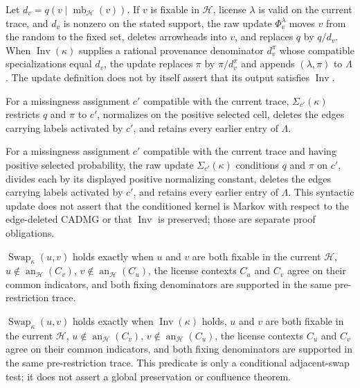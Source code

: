 Let \(d_v=q(v\mid\operatorname{mb}_{\mathcal H}(v))\). If \(v\) is fixable in \(\mathcal H\), license \(\lambda\) is valid on the current trace, and \(d_v\) is nonzero on the stated support, the raw update \(\Phi_v^{\lambda}\) moves \(v\) from the random to the fixed set, deletes arrowheads into \(v\), and replaces \(q\) by \(q/d_v\). When \(\operatorname{Inv}(\kappa)\) supplies a rational provenance denominator \(d_v^{\pi}\) whose compatible specializations equal \(d_v\), the update replaces \(\pi\) by \(\pi/d_v^{\pi}\) and appends \((\lambda,\pi)\) to \(\Lambda\). The update definition does not by itself assert that its output satisfies \(\operatorname{Inv}\).

For a missingness assignment \(c'\) compatible with the current trace, \(\Sigma_{c'}(\kappa)\) restricts \(q\) and \(\pi\) to \(c'\), normalizes on the positive selected cell, deletes the edges carrying labels activated by \(c'\), and retains every earlier entry of \(\Lambda\).

For a missingness assignment \(c'\) compatible with the current trace and having positive selected probability, the raw update \(\Sigma_{c'}(\kappa)\) conditions \(q\) and \(\pi\) on \(c'\), divides each by its displayed positive normalizing constant, deletes the edges carrying labels activated by \(c'\), and retains every earlier entry of \(\Lambda\). This syntactic update does not assert that the conditioned kernel is Markov with respect to the edge-deleted CADMG or that \(\operatorname{Inv}\) is preserved; those are separate proof obligations.

\(\operatorname{Swap}_{\kappa}(u,v)\) holds exactly when \(u\) and \(v\) are both fixable in the current \(\mathcal H\), \(u\notin\operatorname{an}_{\mathcal H}(C_v)\), \(v\notin\operatorname{an}_{\mathcal H}(C_u)\), the license contexts \(C_u\) and \(C_v\) agree on their common indicators, and both fixing denominators are supported in the same pre-restriction trace.

\(\operatorname{Swap}_{\kappa}(u,v)\) holds exactly when \(\operatorname{Inv}(\kappa)\) holds, \(u\) and \(v\) are both fixable in the current \(\mathcal H\), \(u\notin\operatorname{an}_{\mathcal H}(C_v)\), \(v\notin\operatorname{an}_{\mathcal H}(C_u)\), the license contexts \(C_u\) and \(C_v\) agree on their common indicators, and both fixing denominators are supported in the same pre-restriction trace. This predicate is only a conditional adjacent-swap test; it does not assert a global preservation or confluence theorem.

